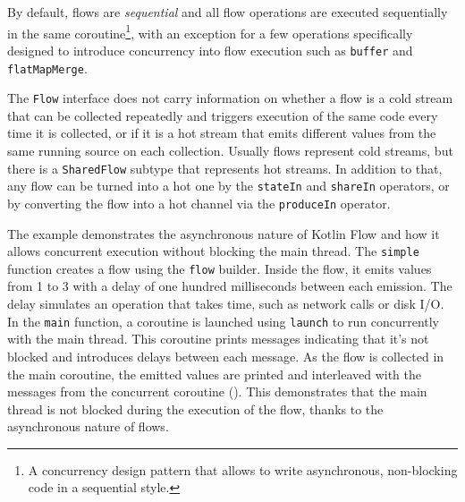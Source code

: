 By default, flows are \textit{sequential} and all flow operations are executed sequentially in the same coroutine\footnote{A concurrency design pattern that allows to write asynchronous, non-blocking code in a sequential style.}, with an exception for a few operations specifically designed to introduce concurrency into flow execution such as \texttt{buffer} and \texttt{flatMapMerge}.

The \texttt{Flow} interface does not carry information on whether a flow is a cold stream that can be collected repeatedly and triggers execution of the same code every time it is collected, or if it is a hot stream that emits different values from the same running source on each collection. Usually flows represent cold streams, but there is a \texttt{SharedFlow} subtype that represents hot streams. In addition to that, any flow can be turned into a hot one by the \texttt{stateIn} and \texttt{shareIn} operators, or by converting the flow into a hot channel via the \texttt{produceIn} operator.

The example  demonstrates the asynchronous nature of Kotlin Flow and how it allows concurrent execution without blocking the main thread. The \texttt{simple} function creates a flow using the \texttt{flow} builder. Inside the flow, it emits values from 1 to 3 with a delay of one hundred milliseconds between each emission. The delay simulates an operation that takes time, such as network calls or disk I/O. In the \texttt{main} function, a coroutine is launched using \texttt{launch} to run concurrently with the main thread. This coroutine prints messages indicating that it's not blocked and introduces delays between each message. As the flow is collected in the main coroutine, the emitted values are printed and interleaved with the messages from the concurrent coroutine (). This demonstrates that the main thread is not blocked during the execution of the flow, thanks to the asynchronous nature of flows.

\begin{figure}
    \centering
    \begin{subfigure}[b]{\textwidth}
        \centering
        
    \end{subfigure}
    \hfill
    \begin{subfigure}[b]{\textwidth}
        \centering
        
    \end{subfigure}
\end{figure}

